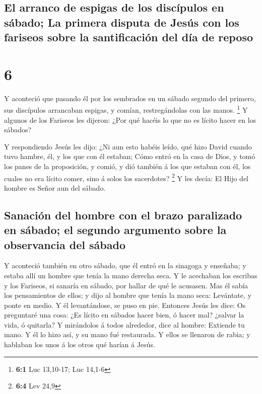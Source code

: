 \hypertarget{el-arranco-de-espigas-de-los-discuxedpulos-en-suxe1bado-la-primera-disputa-de-jesuxfas-con-los-fariseos-sobre-la-santificaciuxf3n-del-duxeda-de-reposo}{%
\subsection{El arranco de espigas de los discípulos en sábado; La
primera disputa de Jesús con los fariseos sobre la santificación del día
de
reposo}\label{el-arranco-de-espigas-de-los-discuxedpulos-en-suxe1bado-la-primera-disputa-de-jesuxfas-con-los-fariseos-sobre-la-santificaciuxf3n-del-duxeda-de-reposo}}

\hypertarget{section-5}{%
\section{6}\label{section-5}}

 Y aconteció que pasando él por los sembrados en un sábado
segundo del primero, sus discípulos arrancaban espigas, y comían,
restregándolas con las manos. \footnote{\textbf{6:1} Luc 13,10-17; Luc
  14,1-6}  Y algunos de los Fariseos les dijeron: ¿Por qué
hacéis lo que no es lícito hacer en los sábados?

 Y respondiendo Jesús les dijo: ¿Ni aun esto habéis leído,
qué hizo David cuando tuvo hambre, él, y los que con él estaban;
 Cómo entró en la casa de Dios, y tomó los panes de la
proposición, y comió, y dió también á los que estaban con él, los cuales
no era lícito comer, sino á solos los sacerdotes? \footnote{\textbf{6:4}
  Lev 24,9}  Y les decía: El Hijo del hombre es Señor aun
del sábado.

\hypertarget{sanaciuxf3n-del-hombre-con-el-brazo-paralizado-en-suxe1bado-el-segundo-argumento-sobre-la-observancia-del-suxe1bado}{%
\subsection{Sanación del hombre con el brazo paralizado en sábado; el
segundo argumento sobre la observancia del
sábado}\label{sanaciuxf3n-del-hombre-con-el-brazo-paralizado-en-suxe1bado-el-segundo-argumento-sobre-la-observancia-del-suxe1bado}}

 Y aconteció también en otro sábado, que él entró en la
sinagoga y enseñaba; y estaba allí un hombre que tenía la mano derecha
seca.  Y le acechaban los escribas y los Fariseos, si
sanaría en sábado, por hallar de qué le acusasen.  Mas él
sabía los pensamientos de ellos; y dijo al hombre que tenía la mano
seca: Levántate, y ponte en medio. Y él levantándose, se puso en pie.
 Entonces Jesús les dice: Os preguntaré una cosa: ¿Es
lícito en sábados hacer bien, ó hacer mal? ¿salvar la vida, ó quitarla?
 Y mirándolos á todos alrededor, dice al hombre: Extiende
tu mano. Y él lo hizo así, y su mano fué restaurada.  Y
ellos se llenaron de rabia; y hablaban los unos á los otros qué harían á
Jesús.

